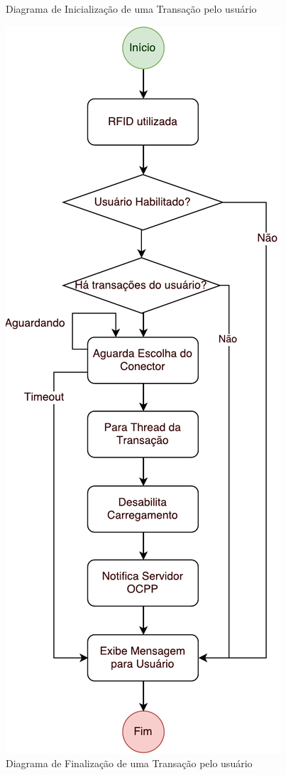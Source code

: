 \begin{figure}[H]
\begin{center}
          \caption{Diagrama de Inicialização de uma Transação pelo usuário}
          \label{fig:sw-starttransaction}
        \end{center}
      \end{figure}

      \begin{figure}[H]
        \begin{center}
          \includegraphics[height=0.8\textheight]{assets/pdfs/sw-stoptransaction.pdf}
          \caption{Diagrama de Finalização de uma Transação pelo usuário}
          \label{fig:sw-stoptransaction}
        \end{center}
      \end{figure}
